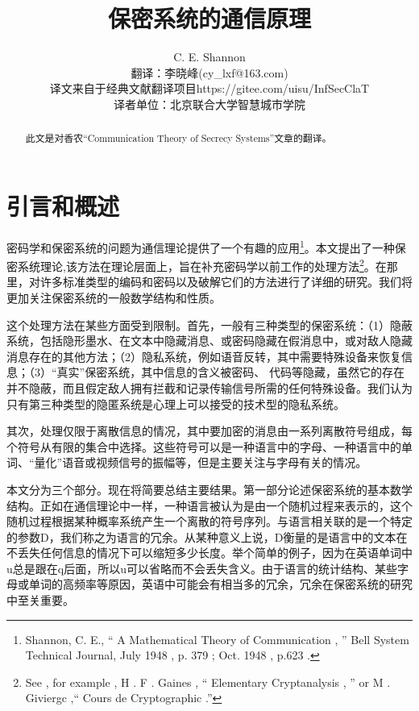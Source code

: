 \documentclass[]{article}
\title{保密系统的通信原理}
\author{C. E. Shannon\\
{\small  翻译：李晓峰(cy\_lxf@163.com)}\\
{\small  译文来自于经典文献翻译项目https://gitee.com/uisu/InfSecClaT}\\
{\small 译者单位：北京联合大学智慧城市学院}
}
\begin{document}
	
	\maketitle
	
	\begin{abstract}
		此文是对香农“Communication Theory of Secrecy Systems”文章的翻译。
	\end{abstract}
	
	\section{引言和概述}
	密码学和保密系统的问题为通信理论提供了一个有趣的应用\footnote{Shannon, C. E., “ A Mathematical Theory of Communication , ”
	Bell System Technical Journal, July 1948 , p. 379 ; Oct. 1948 , p.623 .}。本文提出了一种保密系统理论,该方法在理论层面上，旨在补充密码学以前工作的处理方法\footnote{See , for example , H . F . Gaines , “ Elementary Cryptanalysis , ” or M . Giviergc ,“ Cours de Cryptographic .”}。在那里，对许多标准类型的编码和密码以及破解它们的方法进行了详细的研究。我们将更加关注保密系统的一般数学结构和性质。\par


这个处理方法在某些方面受到限制。首先，一般有三种类型的保密系统：（1）隐蔽系统，包括隐形墨水、在文本中隐藏消息、或密码隐藏在假消息中，或对敌人隐藏消息存在的其他方法；（2）隐私系统，例如语音反转，其中需要特殊设备来恢复信息；（3）“真实”保密系统，其中信息的含义被密码、
代码等隐藏，虽然它的存在并不隐蔽，而且假定敌人拥有拦截和记录传输信号所需的任何特殊设备。我们认为只有第三种类型的隐匿系统是心理上可以接受的技术型的隐私系统。
\par

其次，处理仅限于离散信息的情况，其中要加密的消息由一系列离散符号组成，每个符号从有限的集合中选择。这些符号可以是一种语言中的字母、一种语言中的单词、“量化”语音或视频信号的振幅等，但是主要关注与字母有关的情况。
\par

本文分为三个部分。现在将简要总结主要结果。第一部分论述保密系统的基本数学结构。正如在通信理论中一样，一种语言被认为是由一个随机过程来表示的，这个随机过程根据某种概率系统产生一个离散的符号序列。与语言相关联的是一个特定的参数D，我们称之为语言的冗余。从某种意义上说，D衡量的是语言中的文本在不丢失任何信息的情况下可以缩短多少长度。举个简单的例子，因为在英语单词中u总是跟在q后面，所以u可以省略而不会丢失含义。由于语言的统计结构、某些字母或单词的高频率等原因，英语中可能会有相当多的冗余，冗余在保密系统的研究中至关重要。
\par
\end{document}
